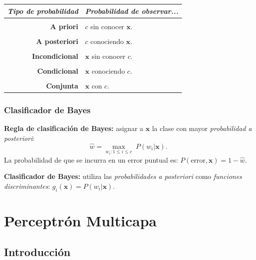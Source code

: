 \documentclass[10pt,a4paper]{article}
\begin{document}
\begin{tabular}{r|p{6cm}}
\textit{Tipo de probabilidad}
& \textit{Probabilidad de observar...}
\\ [1ex] \hline \\ [-1.5ex]
\textbf{A priori}
& $c$ sin conocer $\mathbf{x}$.
\\ [1ex] \hline \\ [-1.5ex]
\textbf{A posteriori}
& $c$ conociendo $\mathbf{x}$.
\\ [1ex] \hline \\ [-1.5ex]
\textbf{Incondicional}
& $\mathbf{x}$ sin conocer $c$.
\\ [1ex] \hline \\ [-1.5ex]
\textbf{Condicional}
& $\mathbf{x}$ conociendo $c$.
\\ [1ex] \hline \\ [-1.5ex]
\textbf{Conjunta}
& $\mathbf{x}$ con $c$.
\\ [1ex] \hline
\end{tabular}


\subsubsection{Clasificador de Bayes}

\begin{description}
\item \textbf{Regla de clasificación de Bayes:} asignar a $\mathbf{x}$ la clase con mayor \textit{probabilidad a posteriori}:
\[ \hat{w} = \max_{w_i:1\leq i \leq c} \; P(w_i|\mathbf{x}).\]
La probabilidad de que se incurra en un error puntual es: $P(\text{error},\mathbf{x})=1 - \hat{w}$.
\item \textbf{Clasificador de Bayes:} utiliza las \textit{probabilidades a posteriori} como \textit{funciones discriminantes}: $g_i(\mathbf{x}) = P(w_i|\mathbf{x})$.
\end{description}


\section{Perceptrón Multicapa}

\subsection{Introducción}
\end{document}
